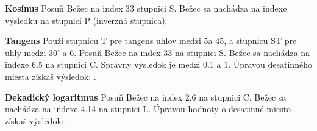 \begin{multicols*}{3}
{  \textbf{Kosínus}
Posuň Bežec na index 33 stupnici S.
Bežec sa nachádza na indexe výsledku  na stupnici P (inverzná stupnica).

  \textbf{Tangens}
\footnotesize Použi stupnicu T pre tangens uhlov medzi 5\textdegree a 45\textdegree, a stupnicu ST pre uhly medzi 30' a 6\textdegree. \normalsize
{}
Posuň Bežec na index 33 na stupnici S.
Bežec sa nachádza na indexe 6.5 na stupnici C.
Správny výsledok je medzi 0.1 a 1. Úpravou desatinného miesta získaš výsledok: .

  \textbf{Dekadický logaritmus}
Posuň Bežec na index 2.6 na stupnici C.
Bežec sa nachádza na indexe 4.14 na stupnici L.
Úpravou hodnoty o desatinné miesto získaš výsledok: .
  }
  \end{multicols*}
  

